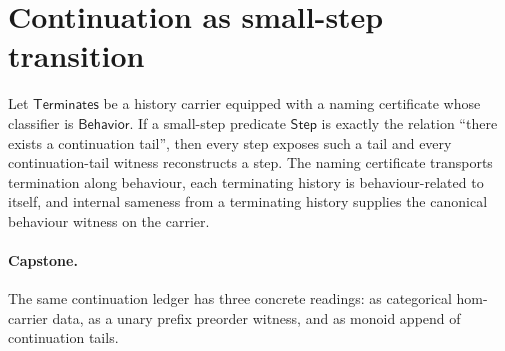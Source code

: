 \section{Continuation as small-step transition}
\label{sec:computation-as-continuation-small-step}

\begin{theorem}
\label{thm:computation-as-continuation-correspondence}
Let $\mathsf{Terminates}$ be a history carrier equipped with a naming certificate whose classifier is $\mathsf{Behavior}$. If a small-step predicate $\mathsf{Step}$ is exactly the relation ``there exists a continuation tail'', then every step exposes such a tail and every continuation-tail witness reconstructs a step. The naming certificate transports termination along behaviour, each terminating history is behaviour-related to itself, and internal sameness from a terminating history supplies the canonical behaviour witness on the carrier.
\end{theorem}

\paragraph{Capstone.}
The same continuation ledger has three concrete readings: as categorical
hom-carrier data, as a unary prefix preorder witness, and as monoid append of
continuation tails.


